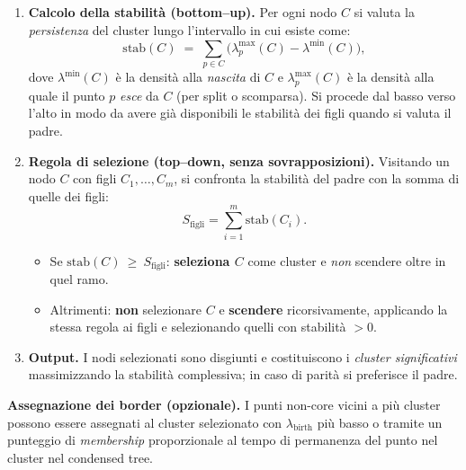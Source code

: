 \begin{enumerate}
  \item \textbf{Calcolo della stabilità (bottom–up).}
  Per ogni nodo $C$ si valuta la \emph{persistenza} del cluster lungo l’intervallo
  in cui esiste come:
  \[
    \mathrm{stab}(C)
    \;=\;
    \sum_{p\in C}\bigl(\lambda^{\text{max}}_{p}(C)-\lambda^{\text{min}}(C)\bigr),
  \]
  dove $\lambda^{\text{min}}(C)$ è la densità alla \emph{nascita} di $C$ e
  $\lambda^{\text{max}}_{p}(C)$ è la densità alla quale il punto $p$
  \emph{esce} da $C$ (per split o scomparsa). Si procede dal basso verso l’alto
  in modo da avere già disponibili le stabilità dei figli quando si valuta il padre.

  \item \textbf{Regola di selezione (top–down, senza sovrapposizioni).}
  Visitando un nodo $C$ con figli $C_1,\dots,C_m$, si confronta la stabilità del
  padre con la somma di quelle dei figli:
  \[
    S_{\text{figli}}=\sum_{i=1}^{m}\mathrm{stab}(C_i).
  \]
  \begin{itemize}
    \item Se $\mathrm{stab}(C)\ \mathbf{\ge}\ S_{\text{figli}}$:
          \textbf{seleziona $C$} come cluster e \emph{non} scendere oltre in quel ramo.
    \item Altrimenti:
          \textbf{non} selezionare $C$ e \textbf{scendere} ricorsivamente,
          applicando la stessa regola ai figli e selezionando quelli con stabilità $>0$.
  \end{itemize}

  \item \textbf{Output.} I nodi selezionati sono disgiunti e costituiscono
  i \emph{cluster significativi} massimizzando la stabilità complessiva;
  in caso di parità si preferisce il padre.
\end{enumerate}

\textbf{Assegnazione dei border (opzionale).} I punti non-core vicini a più cluster possono essere assegnati
al cluster selezionato con \(\lambda_{\text{birth}}\) più basso o tramite un punteggio di \emph{membership} proporzionale
al tempo di permanenza del punto nel cluster nel condensed tree.

